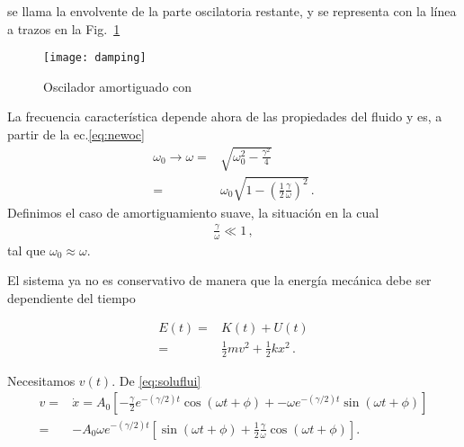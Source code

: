 se llama la envolvente de la parte oscilatoria restante, y se representa con la línea a trazos en la Fig.~\ref{fig:damping}
\begin{frame}
\begin{figure}
  \centering
  \texttt{[image: damping]}
  \caption{Oscilador amortiguado con }
  \label{fig:damping}
\end{figure}
\end{frame}
La frecuencia característica  depende ahora de las propiedades del fluido y es, a partir de  la ec.\eqref{eq:newoc}
\begin{align*}
  \omega_0\to \omega=&\sqrt{\omega_0^2-\frac{\gamma^2}{4}}\nonumber\\
=&\omega_0\sqrt{1-\left(\frac{1}{2}\frac{\gamma}{\omega}\right)^2}\,.
\end{align*}
Definimos el caso de amortiguamiento suave, la situación en la cual
\begin{align}
  \label{eq:SoftDamping}
  \frac{\gamma}{\omega}\ll 1\,,
\end{align}
tal que $\omega_0\approx\omega$. 


El sistema ya no es conservativo de manera que la energía mecánica debe ser dependiente del tiempo

\begin{align*}
  E(t)=&K(t)+U(t)\nonumber\\
=&\tfrac{1}{2}m v^2+\tfrac{1}{2}k x^2\,.
\end{align*}

Necesitamos $v(t)$. De \eqref{eq:soluflui}
\begin{align*}
  v=&\dot{x}=A_0 \left[-\frac{\gamma}{2}e^{-(\gamma/2)t}\cos(\omega t+\phi)+
            -\omega e^{-(\gamma/2)t}\sin(\omega t+\phi)\right]\nonumber\\
=&-A_0 \omega e^{-(\gamma/2)t} \left[\sin(\omega t+\phi)+\frac{1}{2}\frac{\gamma}{\omega}\cos(\omega t+\phi)\right].
\end{align*}

